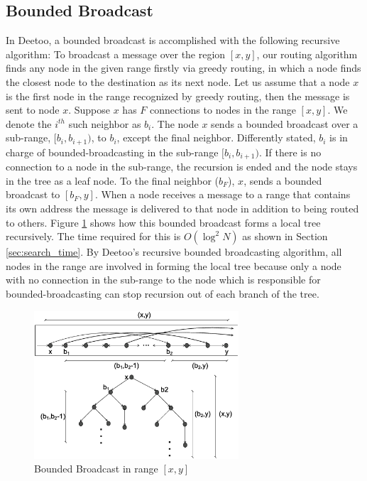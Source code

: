 \documentclass[conference]{IEEEtran}
\begin{document}
\subsection{Bounded Broadcast}
\label{sec:broadcast}

In Deetoo, a bounded broadcast is accomplished with the following 
recursive algorithm:  
To broadcast a message over the region $[x, y]$, 
our routing algorithm finds any node in the given range firstly via greedy routing,
in which a node finds the closest node to the destination as its next node.
Let us assume that a node $x$ is the first node in the range recognized by greedy routing, 
then the message is sent to node $x$. 
Suppose $x$ has $F$ connections to nodes in the range $[x, y]$. 
We denote the $i^{th}$ such neighbor as $b_i$.
The node $x$ sends a bounded broadcast over a sub-range, 
$[b_i, b_{i+1})$, to $b_i$, except the final neighbor. 
Differently stated, $b_i$ is in charge of bounded-broadcasting 
in the sub-range $[b_i, b_{i+1})$. If there is no connection to a node in the sub-range, 
the recursion is ended and the node stays in the tree as a leaf node.
To the final
neighbor ($b_F$), $x$, sends a bounded broadcast to $[b_F, y]$.
When a node receives a message to a range that contains its own address
the message is delivered to that node in addition to being routed to others.
Figure \ref{fig:tree} shows how this bounded broadcast forms a local 
tree recursively. The time required for this is $O(\log^2 N)$ as 
shown in Section \ref{sec:search_time}.
By Deetoo's recursive bounded broadcasting algorithm, all nodes in the range 
are involved in forming the local tree because only a node with no connection 
in the sub-range to the node which is responsible for bounded-broadcasting 
can stop recursion out of each branch of the tree.

\begin{figure}
\centering
\includegraphics[width=3.0in]{tree}
\caption{Bounded Broadcast in range $[x, y]$} \label{fig:tree}
\end{figure}
\end{document}
